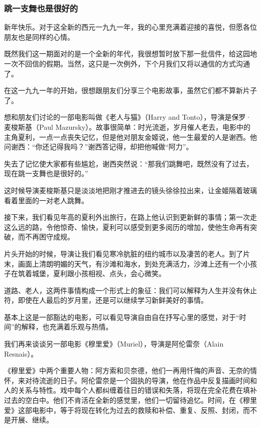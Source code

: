 \subsubsection{跳一支舞也是很好的}


\par {}
\par 新年快乐。对于这全新的西元一九九一年，我的心里充满着迎接的喜悦，但愿各位朋友也是同样的心情。
\par 既然我们这一期面对的是一个全新的年代，我很想暂时放下那一批信件，给这园地一次不回信的假期。当然，这只是一次例外，下个月我们又将以通信的方式沟通了。
\par 在这一九九一年的开始，很想跟朋友们分享三个电影故事，虽然它们都不算新片子了。
\par 想和朋友们讨论的一部电影叫做《老人与猫》（Harry and Tonto），导演是保罗·麦梭斯基（Paul Mazursky）。故事很简单：时光流逝，岁月催人老去，电影中的主角夏利，一点一点丧失记忆，但是他对朋友金姬说，他一生最爱的人是谢西。他问谢西：“你还记得我吗？”谢西答记得，却把他喊做“阿力”。
\par 失去了记忆使大家都有些尴尬，谢西突然说：“那我们跳舞吧，既然没有了过去，现在跳一支舞也是很好的。”
\par 这时候导演麦梭斯基只是淡淡地把刚才推进去的镜头徐徐拉出来，让金姬隔着玻璃看着里面的一对老人跳舞。
\par 接下来，我们看见年高的夏利外出旅行，在路上他认识到更新鲜的事情；第一次走这么远的路，令他惊奇、愉快，夏利可以感受到更多阅历的增加，使他生命再有突破，而不再困守成规。
\par 片头开始的时候，导演让我们看见寒冷肮脏的纽约城市以及凄苦的老人。到了片末，画面上清朗明媚的天气，有沙滩和海水，到处充满活力，沙滩上还有一个小孩子在筑着城堡，夏利跟小孩相视、点头，会心微笑。
\par 道路、老人，这两件事情构成一个形式上的象征：我们可以解释为人生并没有休止符，即使在人最后的岁月里，还是可以继续学习新鲜美好的事情。
\par 基本上这是一部豁达的电影，可以看见导演自由自在抒写心里的感觉，对于“时间”的解释，也充满着乐观与热情。
\par 我们再来谈谈另一部电影《穆里爱》（Muriel），导演是阿伦雷奈（Alain Resnais）。
\par 《穆里爱》中两个重要人物：阿方索和贝奈德，他们一再用忏悔的声音、无奈的情怀，来对待流逝的日子。阿伦雷奈是一个固执的导演，他在作品中反复描画时间和人的关系与特性。戏中每个人都纠缠着往日的错误和失落，将现在完全花费在填补过去的空白中。他们不肯活在全新的感觉里，他们一切留待追忆。时间，在《穆里爱》这部电影中，等于将现在转化为过去的救赎和补偿、重复、反照、封闭，而不是开展、继续。
